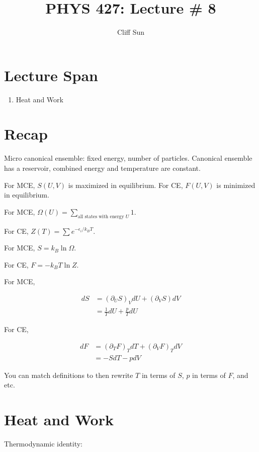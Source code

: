 \documentclass{article}
\title{PHYS 427: Lecture \# 8}
\author{Cliff Sun}
\newtheorem{one minute paper}[theorem]{One Minute Paper}
\begin{document}
\maketitle

\section*{Lecture Span}
\begin{enumerate}
    \item Heat and Work
\end{enumerate}

\section*{Recap}

Micro canonical ensemble: fixed energy, number of particles. Canonical ensemble has a reservoir, combined energy and temperature are constant. 

For MCE, $S(U,V)$ is maximized in equilibrium. For CE, $F(U,V)$ is minimized in equilibrium. 

For MCE, $\Omega(U) = \sum_{\text{all states with energy $U$}} 1$. 

For CE, $Z(T) = \sum e^{-\epsilon_i/k_B T}$. 

For MCE, $S = k_B \ln \Omega$. 

For CE, $F = -k_B T \ln Z$. 

For MCE, 

\begin{align}
    dS &= \left( \partial_{U}S \right)_V dU + \left( \partial_{V}S \right)dV \\
    &= \frac{1}{T}dU + \frac{p}{T}dU
\end{align}

For CE, 

\begin{align}
    dF &= \left( \partial_{T}F \right)_TdT  + \left( \partial_V F\right)_T dV \\
    &= -S dT - pdV
\end{align}

You can match definitions to then rewrite $T$ in terms of $S$, $p$ in terms of $F$, and etc. 

\section*{Heat and Work}

Thermodynamic identity:
\end{document}
